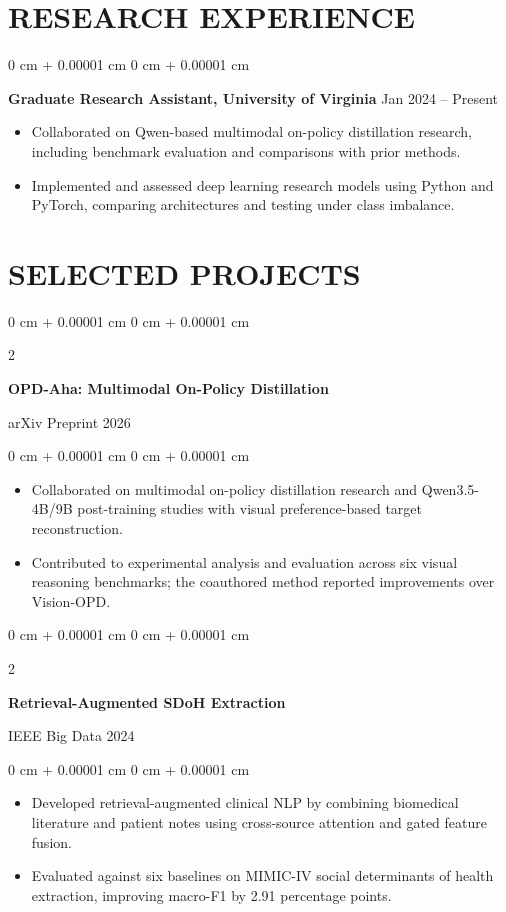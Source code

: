 \documentclass[10pt, letterpaper]{article}
\newenvironment{highlights}{
    \begin{itemize}[
        topsep=0.03 cm,
        parsep=0.03 cm,
        partopsep=0pt,
        itemsep=0pt,
        leftmargin=0 cm + 10pt
    ]
}{
    \end{itemize}
} %
\newenvironment{onecolentry}{
    \begin{adjustwidth}{
        0 cm + 0.00001 cm
    }{
        0 cm + 0.00001 cm
    }
}{
    \end{adjustwidth}
} %
\newenvironment{twocolentry}[2][]{
    \onecolentry
    \def\secondColumn{#2}
    \setcolumnwidth{\fill, 4.5 cm}
    \begin{paracol}{2}
}{
    \switchcolumn \raggedleft \secondColumn
    \end{paracol}
    \endonecolentry
} %
\begin{document}
\section{RESEARCH EXPERIENCE}
\begin{onecolentry}
\textbf{Graduate Research Assistant, University of Virginia} \hfill Jan 2024 -- Present
\begin{highlights}
\item Collaborated on Qwen-based multimodal on-policy distillation research, including benchmark evaluation and comparisons with prior methods.
\item Implemented and assessed deep learning research models using Python and PyTorch, comparing architectures and testing under class imbalance.
\end{highlights}
\end{onecolentry}
\section{SELECTED PROJECTS}
\begin{twocolentry}{arXiv Preprint 2026}
\textbf{OPD-Aha: Multimodal On-Policy Distillation}
\end{twocolentry}
\begin{onecolentry}
\begin{highlights}
\item Collaborated on multimodal on-policy distillation research and Qwen3.5-4B/9B post-training studies with visual preference-based target reconstruction.
\item Contributed to experimental analysis and evaluation across six visual reasoning benchmarks; the coauthored method reported improvements over Vision-OPD.
\end{highlights}
\end{onecolentry}
\vspace{0.035 cm}

\begin{twocolentry}{IEEE Big Data 2024}
\textbf{Retrieval-Augmented SDoH Extraction}
\end{twocolentry}
\begin{onecolentry}
\begin{highlights}
\item Developed retrieval-augmented clinical NLP by combining biomedical literature and patient notes using cross-source attention and gated feature fusion.
\item Evaluated against six baselines on MIMIC-IV social determinants of health extraction, improving macro-F1 by 2.91 percentage points.
\end{highlights}
\end{onecolentry}
\vspace{0.035 cm}
\end{document}
